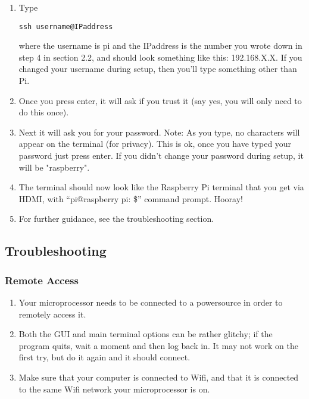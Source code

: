\documentclass{article}\usepackage[]{graphicx}\usepackage[]{color}
\begin{document}
\begin{enumerate}
\item Type 
\begin{lstlisting}
ssh username@IPaddress
\end{lstlisting}
where the username is pi and the IPaddress is the number you wrote down in step 4 in section 2.2, and should look something like this: 192.168.X.X. If you changed your username during setup, then you'll type something other than Pi.

\item Once you press enter, it will ask if you trust it (say yes, you will only need to do this once). 

\item Next it will ask you for your password.  Note: As you type, no characters will appear on the terminal (for privacy).  This is ok, once you have typed your password just press enter.  If you didn't change your password during setup, it will be "raspberry".

\item The terminal should now look like the Raspberry Pi terminal that you get via HDMI, with ``pi@raspberry pi: \$'' command prompt.  Hooray!
\item For further guidance, see the troubleshooting section.

\end{enumerate}


\subsection{Troubleshooting}

\subsubsection{Remote Access}

\begin{enumerate}

\item Your microprocessor needs to be connected to a powersource in order to remotely access it.

\item Both the GUI and main terminal options can be rather glitchy; if the program quits, wait a moment and then log back in.  It may not work on the first try, but do it again and it should connect.
\item Make sure that your computer is connected to Wifi, and that it is connected to the same Wifi network your microprocessor is on.

\end{enumerate}
\end{document}
